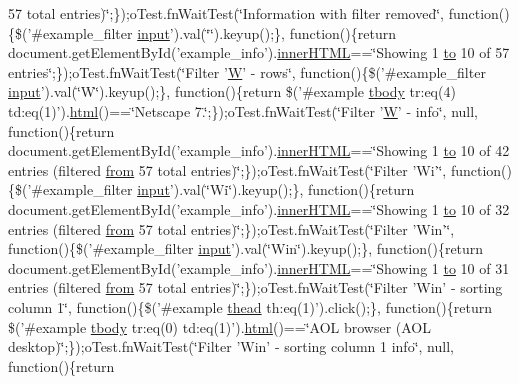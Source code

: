 \begin{DoxyCompactItemize}
57 total entries)\char`\"{};\});o\+Test.\+fn\+Wait\+Test(\char`\"{}Information with filter removed\char`\"{}, function()\{\$('\#example\+\_\+filter \hyperlink{validate_8js_a07a2aabd64594dc36dd810cad2669deb}{input}').val(\char`\"{}\char`\"{}).keyup();\}, function()\{return document.\+get\+Element\+By\+Id('example\+\_\+info').\hyperlink{jquery-ui_8js_a87f73c4f0391c1cf9fe60374a76d9a7b}{inner\+H\+T\+M\+L}==\char`\"{}Showing 1 \hyperlink{jquery-ui_8js_af6086621f45baa2cf538f19e45d3c263}{to} 10 of 57 entries\char`\"{};\});o\+Test.\+fn\+Wait\+Test(\char`\"{}Filter '\hyperlink{jquery_8fancybox_8js_a0b02f09bf5aa8ca34f72487f7d0e6e63}{W}' -\/ rows\char`\"{}, function()\{\$('\#example\+\_\+filter \hyperlink{validate_8js_a07a2aabd64594dc36dd810cad2669deb}{input}').val(\char`\"{}W\char`\"{}).keyup();\}, function()\{return \$('\#example \hyperlink{core_8constructor_8js_a99b0542c7c50fe8757c55bf9dac5f3be}{tbody} tr\+:eq(4) td\+:eq(1)').\hyperlink{tinymce_8jquery_8dev_8js_ac2090bcf2ff968c0083d5de53a6544f3}{html}()==\char`\"{}Netscape 7.\char`\"{};\});o\+Test.\+fn\+Wait\+Test(\char`\"{}Filter '\hyperlink{jquery_8fancybox_8js_a0b02f09bf5aa8ca34f72487f7d0e6e63}{W}' -\/ info\char`\"{}, null, function()\{return document.\+get\+Element\+By\+Id('example\+\_\+info').\hyperlink{jquery-ui_8js_a87f73c4f0391c1cf9fe60374a76d9a7b}{inner\+H\+T\+M\+L}==\char`\"{}Showing 1 \hyperlink{jquery-ui_8js_af6086621f45baa2cf538f19e45d3c263}{to} 10 of 42 entries (filtered \hyperlink{jquery-ui_8js_ace03b192fd101a1c5648340bc09b7229}{from} 57 total entries)\char`\"{};\});o\+Test.\+fn\+Wait\+Test(\char`\"{}Filter 'Wi'\char`\"{}, function()\{\$('\#example\+\_\+filter \hyperlink{validate_8js_a07a2aabd64594dc36dd810cad2669deb}{input}').val(\char`\"{}Wi\char`\"{}).keyup();\}, function()\{return document.\+get\+Element\+By\+Id('example\+\_\+info').\hyperlink{jquery-ui_8js_a87f73c4f0391c1cf9fe60374a76d9a7b}{inner\+H\+T\+M\+L}==\char`\"{}Showing 1 \hyperlink{jquery-ui_8js_af6086621f45baa2cf538f19e45d3c263}{to} 10 of 32 entries (filtered \hyperlink{jquery-ui_8js_ace03b192fd101a1c5648340bc09b7229}{from} 57 total entries)\char`\"{};\});o\+Test.\+fn\+Wait\+Test(\char`\"{}Filter 'Win'\char`\"{}, function()\{\$('\#example\+\_\+filter \hyperlink{validate_8js_a07a2aabd64594dc36dd810cad2669deb}{input}').val(\char`\"{}Win\char`\"{}).keyup();\}, function()\{return document.\+get\+Element\+By\+Id('example\+\_\+info').\hyperlink{jquery-ui_8js_a87f73c4f0391c1cf9fe60374a76d9a7b}{inner\+H\+T\+M\+L}==\char`\"{}Showing 1 \hyperlink{jquery-ui_8js_af6086621f45baa2cf538f19e45d3c263}{to} 10 of 31 entries (filtered \hyperlink{jquery-ui_8js_ace03b192fd101a1c5648340bc09b7229}{from} 57 total entries)\char`\"{};\});o\+Test.\+fn\+Wait\+Test(\char`\"{}Filter 'Win' -\/ sorting column 1\char`\"{}, function()\{\$('\#example \hyperlink{core_8constructor_8js_a856be760b6816c9591ce69f0a2b43693}{thead} th\+:eq(1)').click();\}, function()\{return \$('\#example \hyperlink{core_8constructor_8js_a99b0542c7c50fe8757c55bf9dac5f3be}{tbody} tr\+:eq(0) td\+:eq(1)').\hyperlink{tinymce_8jquery_8dev_8js_ac2090bcf2ff968c0083d5de53a6544f3}{html}()==\char`\"{}A\+O\+L browser (A\+O\+L desktop)\char`\"{};\});o\+Test.\+fn\+Wait\+Test(\char`\"{}Filter 'Win' -\/ sorting column 1 info\char`\"{}, null, function()\{return 
\end{DoxyCompactItemize}
